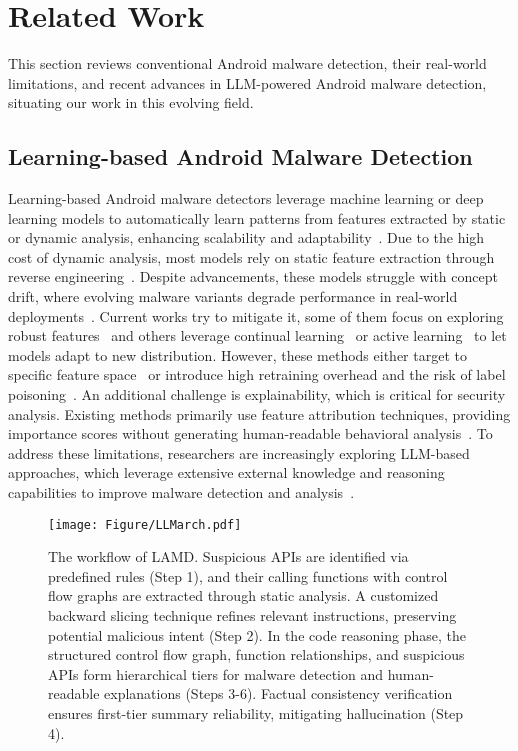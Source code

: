 \section{Related Work}
This section reviews conventional Android malware detection, their real-world limitations, and recent advances in LLM-powered Android malware detection, situating our work in this evolving field.


\subsection{Learning-based Android Malware Detection}
Learning-based Android malware detectors leverage machine learning or deep learning models to automatically learn patterns from features extracted by static or dynamic analysis, enhancing scalability and adaptability~\cite{unraveling}. Due to the high cost of dynamic analysis, most models rely on static feature extraction through reverse engineering~\cite{Arpdrebin, Grossedeepdrebin}. Despite advancements, these models struggle with concept drift, where evolving malware variants degrade performance in real-world deployments~\cite{transcend, transcending}. Current works try to mitigate it, some of them focus on exploring robust features~\cite{scrr,damo,svm_ce,apigraph} and others leverage continual learning~\cite{continuous, tesseract,malware_evolution_update} or active learning~\cite{droidevolver, online_mal} to let models adapt to new distribution. However, these methods either target to specific feature space~\cite{scrr} or introduce high retraining overhead and the risk of label poisoning~\cite{recda, labelless}. An additional challenge is explainability, which is critical for security analysis. Existing methods primarily use feature attribution techniques, providing importance scores without generating human-readable behavioral analysis~\cite{finer, belaid}. To address these limitations, researchers are increasingly exploring LLM-based approaches, which leverage extensive external knowledge and reasoning capabilities to improve malware detection and analysis~\cite{code_explain,code_explain_2}.

\begin{figure*}[t]
    \centering
    \setlength{\abovecaptionskip}{0cm}
    \texttt{[image: Figure/LLMarch.pdf]}
    \caption{The workflow of LAMD. Suspicious APIs are identified via predefined rules (Step 1), and their calling functions with control flow graphs are extracted through static analysis. A customized backward slicing technique refines relevant instructions, preserving potential malicious intent (Step 2). In the code reasoning phase, the structured control flow graph, function relationships, and suspicious APIs form hierarchical tiers for malware detection and human-readable explanations (Steps 3-6). Factual consistency verification ensures first-tier summary reliability, mitigating hallucination (Step 4).}
    \label{fig:arch}
\end{figure*}


